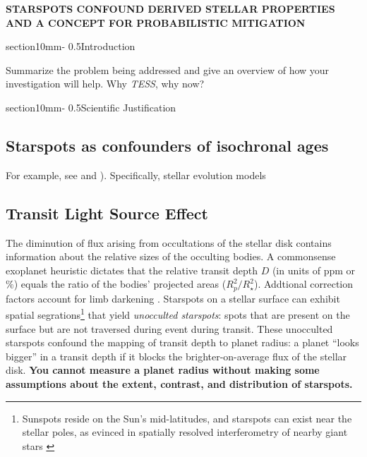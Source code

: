 \documentclass[letterpaper,11pt]{article}
\makeatletter
\renewcommand{\section}{\@startsection%
{section}{1}{0mm}{-\baselineskip}%
{0.5\baselineskip}{\normalfont\Large\bfseries}}%
\newcommand{\tess}{{\it TESS}}
\makeatother
\begin{document}
\pagestyle{plain}




\begin{center}
\bfseries\uppercase{%
Starspots confound derived stellar properties and a concept for probabilistic mitigation
}
\end{center}




\section{Introduction}

Summarize the problem being addressed and give an overview of how your investigation will help.
Why \tess, why now?


\section{Scientific Justification}



\subsection{Starspots as confounders of isochronal ages}
For example, see \cite{2015ApJ...807..174S} and \cite{2015arXiv150706460F}).  Specifically, stellar evolution models



\subsection{Transit Light Source Effect}
The diminution of flux arising from occultations of the stellar disk contains information about the relative sizes of the occulting bodies.  A commonsense exoplanet heuristic dictates that the relative transit depth $D$ (in units of ppm or $\%$) equals the ratio of the bodies' projected areas ($R_p^2/R_\star^2$).  Addtional correction factors account for limb darkening \citep{2002ApJ...580L.171M}.  Starspots on a stellar surface can exhibit spatial segrations\footnote{Sunspots reside on the Sun's mid-latitudes, and starspots can exist near the stellar poles, as evinced in spatially resolved interferometry of nearby giant stars \citep{2016Natur.533..217R}} that yield \emph{unocculted starspots}: spots that are present on the surface but are not traversed during event during transit.  These unocculted starspots confound the mapping of transit depth to planet radius: a planet ``looks bigger'' in a transit depth if it blocks the brighter-on-average flux of the stellar disk.  \textbf{You cannot measure a planet radius without making some assumptions about the extent, contrast, and distribution of starspots.}
\end{document}
